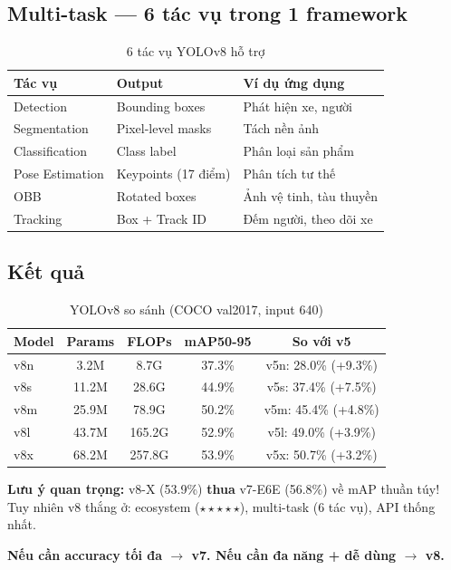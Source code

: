 \subsection{Multi-task --- 6 tác vụ trong 1 framework}
\begin{table}[H]\centering
\caption{6 tác vụ YOLOv8 hỗ trợ}
\begin{tabular}{lll}\toprule
\textbf{Tác vụ} & \textbf{Output} & \textbf{Ví dụ ứng dụng} \\\midrule
Detection & Bounding boxes & Phát hiện xe, người \\
Segmentation & Pixel-level masks & Tách nền ảnh \\
Classification & Class label & Phân loại sản phẩm \\
Pose Estimation & Keypoints (17 điểm) & Phân tích tư thế \\
OBB & Rotated boxes & Ảnh vệ tinh, tàu thuyền \\
Tracking & Box + Track ID & Đếm người, theo dõi xe \\\bottomrule
\end{tabular}
\end{table}

\subsection{Kết quả}
\begin{table}[H]\centering
\caption{YOLOv8 so sánh (COCO val2017, input 640)}
\begin{tabular}{lcccc}\toprule
\textbf{Model} & \textbf{Params} & \textbf{FLOPs} & \textbf{mAP50-95} & \textbf{So với v5}\\\midrule
v8n & 3.2M & 8.7G & 37.3\% & v5n: 28.0\% (+9.3\%) \\
v8s & 11.2M & 28.6G & 44.9\% & v5s: 37.4\% (+7.5\%) \\
v8m & 25.9M & 78.9G & 50.2\% & v5m: 45.4\% (+4.8\%) \\
v8l & 43.7M & 165.2G & 52.9\% & v5l: 49.0\% (+3.9\%) \\
v8x & 68.2M & 257.8G & 53.9\% & v5x: 50.7\% (+3.2\%) \\\bottomrule
\end{tabular}
\end{table}

\textbf{Lưu ý quan trọng:} v8-X (53.9\%) \textbf{thua} v7-E6E (56.8\%) về mAP thuần túy! Tuy nhiên v8 thắng ở: ecosystem ($\star\star\star\star\star$), multi-task (6 tác vụ), API thống nhất.

\textbf{Nếu cần accuracy tối đa $\rightarrow$ v7. Nếu cần đa năng + dễ dùng $\rightarrow$ v8.}
